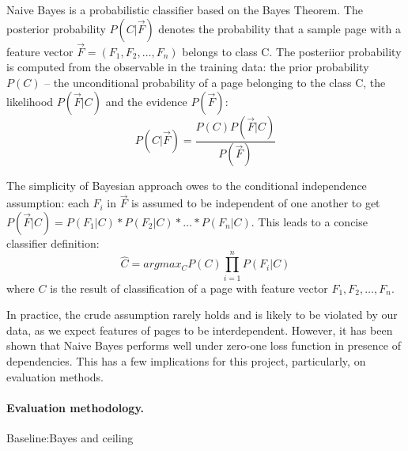 \documentclass[12pt,twoside,notitlepage]{report}
\begin{document}
Naive Bayes is a probabilistic classifier based on the Bayes Theorem. The
posterior probability \(P(C|\vec{F})\) denotes the probability that a sample
page with a feature vector \(\vec{F}=(F_1,F_2,\dots,F_n)\) belongs to class C.
The posteriior probability is computed from the observable in the training data: the prior
probability \(P(C)\) -- the unconditional probability of a page belonging to
the class C, the likelihood \(P(\vec{F}|C)\) and the evidence \(P(\vec{F})\):
\begin{equation}
P(C|\vec{F}) = \frac{P(C)P(\vec{F}|C)}{P(\vec{F})}
\end{equation}

The simplicity of Bayesian approach owes to the conditional independence
assumption: each \(F_i\) in \(\vec{F}\) is assumed to be independent of one
another to get \(P(\vec{F}|C)=P(F_1|C)*P(F_2|C)*\dots*P(F_n|C)\). This leads to a concise classifier definition:
\begin{equation}
\hat{C}= argmax_C P(C)\prod_{i=1}^{n}P(F_i|C)
\end{equation}
where \(C\) is the result of classification of a page with feature vector
\(F_1,F_2,\dots,F_n\).

In practice, the crude assumption rarely  holds and is likely to
be violated by our data, as we expect features of pages to be interdependent.
However, it has been shown that Naive Bayes performs well under zero-one loss
function in presence of dependencies\cite{domingos96}. This has a few
implications for this project, particularly, on evaluation methods. 


\paragraph{Evaluation methodology.}
Baseline:Bayes and ceiling
\end{document}
